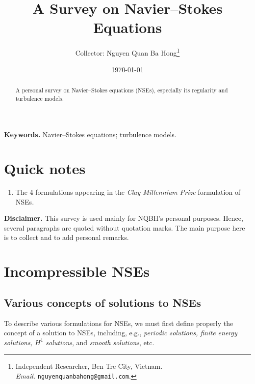 \documentclass{article}
\title{A Survey on Navier--Stokes Equations}
\author{Collector: Nguyen Quan Ba Hong\footnote{Independent Researcher, Ben Tre City, Vietnam.\\\textit{Email.} \texttt{nguyenquanbahong@gmail.com}.}}
\date{\today}
\numberwithin{equation}{section}
\begin{document}
\maketitle

\begin{abstract}
	A personal survey on Navier--Stokes equations (NSEs), especially its regularity and turbulence models.
\end{abstract}
\textbf{Keywords.} Navier--Stokes equations; turbulence models.

\tableofcontents


\section*{Quick notes}
\begin{enumerate}
	\item The 4 formulations appearing in the \textit{Clay Millennium Prize} formulation \cite{Fefferman2006} of NSEs.
\end{enumerate}
\textbf{Disclaimer.} This survey is used mainly for NQBH's personal purposes. Hence, several paragraphs are quoted without quotation marks. The main purpose here is to collect and to add personal remarks.

\section{Incompressible NSEs}

\subsection{Various concepts of solutions to NSEs}
To describe various formulations for NSEs, we must first define properly the concept of a solution to NSEs, including, e.g., \textit{periodic solutions, finite energy solutions, $H^1$ solutions}, and \textit{smooth solutions}, etc.
\end{document}
